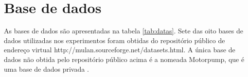 \begin{itemize}
 
\end{itemize}




\section{Base de dados}
\label{sec:datas}
As bases de dados são apresentadas na tabela \ref{tab:datas}.
Sete das oito bases de dados utilizadas nos experimentos foram obtidas do repositório público
de endereço virtual http://mulan.sourceforge.net/datasets.html.
A única base de dados não obtida pelo repositório público acima é a nomeada Motorpump, que é uma
base de dados privada \cite{mendel2008}.



